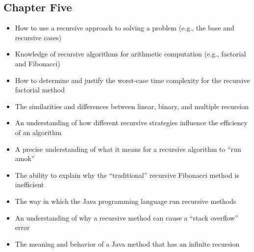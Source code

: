 \documentclass[11pt]{article}
\begin{document}
\vspace*{-.2in}
\subsection*{Chapter Five}

\begin{itemize}

  \item How to use a recursive approach to solving a problem (e.g., the base
    and recursive cases)
  \item Knowledge of recursive algorithms for arithmetic computation (e.g., factorial
    and Fibonacci)
  \item How to determine and justify the worst-case time complexity for
    the recursive factorial method
  \item The similarities and differences between linear, binary, and multiple
    recursion
  \item An understanding of how different recursive strategies influence the
    efficiency of an algorithm
  \item A precise understanding of what it means for a recursive algorithm to
    ``run amok''
  \item The ability to explain why the ``traditional'' recursive Fibonacci
    method is inefficient
  \item The way in which the Java programming language run recursive methods
  \item An understanding of why a recursive method can cause a ``stack
    overflow'' error
  \item The meaning and behavior of a Java method that has an infinite recursion

\end{itemize}
\end{document}
